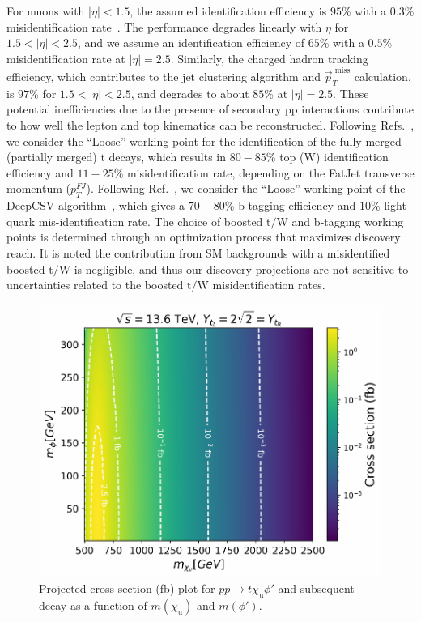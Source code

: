 For muons with $|\eta|< 1.5$, the assumed identification efficiency is $95$\% with a $0.3$\% misidentification rate~\parencite{CMS-PAS-FTR-13-014,CMS_MUON_17001}. The performance degrades linearly with $\eta$ for $1.5 < |\eta| < 2.5$, and we assume an identification efficiency of $65$\% with a $0.5$\% misidentification rate at $|\eta| = 2.5$. Similarly, the charged hadron tracking efficiency, which contributes to the jet clustering algorithm and $\vec{p}_{T}^{\textrm{~miss}}$ calculation, is $97$\% for $1.5 < |\eta| < 2.5$, and degrades to about $85$\% at $|\eta| = 2.5$. These potential inefficiencies due to the presence of secondary \textrm{pp} interactions contribute to how well the lepton and top kinematics can be reconstructed. Following Refs.~\parencite{CMS:2020poo,ATLAS:2018wis}, we consider the ``Loose'' working point for the identification of the fully merged (partially merged) $\mathrm{t}$ decays, which results in $80-85$\% top (\textrm{W}) identification efficiency and $11-25$\% misidentification rate, depending on the FatJet transverse momentum ($p_{T}^{FJ}$). Following Ref.~\parencite{CMSbtag}, we consider the ``Loose'' working point of the DeepCSV algorithm~\parencite{Bols_2020}, which gives a $70-80$\% \textrm{b}-tagging efficiency and $10$\% light quark mis-identification rate. The choice of boosted $\mathrm{t/W}$ and \textrm{b}-tagging working points is determined through an optimization process that maximizes discovery reach. It is noted the contribution from SM backgrounds with a misidentified boosted $\mathrm{t/W}$ is negligible, and thus our discovery projections are not sensitive to uncertainties related to the boosted $\mathrm{t/W}$ misidentification rates. 

\begin{figure}
    \centering
    \includegraphics[width=0.85\linewidth]{Images/cross_section_by_masses.pdf}
    \caption{Projected cross section (fb) plot for $pp\to t \chi_\mathrm{u} \phi'$ and subsequent decay as a function of $m(\chi_\mathrm{u})$ and $m(\phi')$.}
    \label{fig:xs-plot}
\end{figure}

